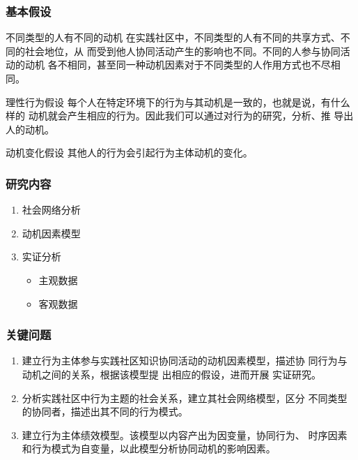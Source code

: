 \documentclass[slidestop,compress,mathserif,blue,compress]{beamer}
\begin{document}
\begin{frame}
  \frametitle{基本假设}
\vfill
  \begin{block}{不同类型的人有不同的动机}
     在实践社区中，不同类型的人有不同的共享方式、不同的社会地位，从
     而受到他人协同活动产生的影响也不同。不同的人参与协同活动的动机
    各不相同，甚至同一种动机因素对于不同类型的人作用方式也不尽相同。
  \end{block}
  \begin{block}{理性行为假设}
    每个人在特定环境下的行为与其动机是一致的，也就是说，有什么样的
    动机就会产生相应的行为。因此我们可以通过对行为的研究，分析、推
    导出人的动机。
  \end{block}
  \begin{block}{动机变化假设}
    其他人的行为会引起行为主体动机的变化。
  \end{block}
\end{frame}
\vfill
\begin{frame}
  \frametitle{研究内容}
  
  \begin{enumerate}
  \vfill
   \pause \item 社会网络分析
   \pause \item  动机因素模型
   \pause \item  实证分析
   \begin{itemize}
   \item 主观数据
    \item  客观数据
   \end{itemize}
 \vfill
  \end{enumerate}
\end{frame}

\begin{frame}
  \frametitle{关键问题}
  \begin{enumerate}
\item 建立行为主体参与实践社区知识协同活动的动机因素模型，描述协
           同行为与动机之间的关系，根据该模型提 出相应的假设，进而开展
           实证研究。
\item  分析实践社区中行为主题的社会关系，建立其社会网络模型，区分
            不同类型的协同者，描述出其不同的行为模式。
\item 建立行为主体绩效模型。该模型以内容产出为因变量，协同行为、
            时序因素和行为模式为自变量，以此模型分析协同动机的影响因素。
\end{enumerate}
\end{frame}
\end{document}
